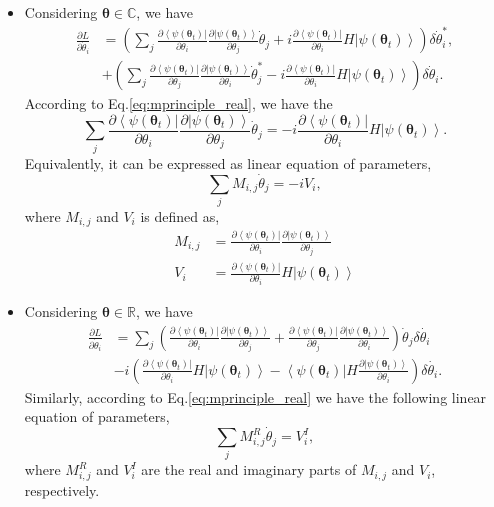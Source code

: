 \documentclass[twocolumn,
pra,aps,superscriptaddress,showpacs,amsmath,amssymb]{revtex4-2}
\begin{document}
\begin{itemize}
\item Considering $\bm{\theta} \in \mathbb{C}$, we have
\begin{align}
\frac{\partial{L}}{\partial\dot{\theta}_i}& =\left(\sum_j\frac{\partial\left<\psi(\bm{\theta}_t)\right|}{\partial\theta_i}\frac{\partial\left|\psi(\bm{\theta}_t)\right>}{\partial\theta_j}\dot{\theta}_j+i\frac{\partial\left<\psi(\bm{\theta}_t)\right|}{\partial\theta_i}H\left|\psi(\bm{\theta}_t)\right>\right)\delta\dot{\theta}_i^*,  \\
&+\left(\sum_j\frac{\partial\left<\psi(\bm{\theta}_t)\right|}{\partial\theta_j}\frac{\partial\left|\psi(\bm{\theta}_t)\right>}{\partial\theta_i}\dot{\theta}_j^*-i\frac{\partial\left<\psi(\bm{\theta}_t)\right|}{\partial\theta_i}H\left|\psi(\bm{\theta}_t)\right>\right)\delta\dot{\theta}_i.
\end{align}
According to Eq.\eqref{eq:mprinciple_real}, we have the 
\begin{equation}
\sum_j\frac{\partial\left<\psi(\bm{\theta}_t)\right|}{\partial\theta_i}\frac{\partial\left|\psi(\bm{\theta}_t)\right>}{\partial\theta_j}\dot{\theta}_j=-i\frac{\partial\left<\psi(\bm{\theta}_t)\right|}{\partial\theta_i}H\left|\psi(\bm{\theta}_t)\right>.
\end{equation}
Equivalently, it can be expressed as linear equation of parameters,
\begin{equation}
\sum_jM_{i,j}\dot{\theta}_j=-iV_i,
\end{equation}
where $M_{i,j}$ and $V_i$ is defined as,
\begin{align}
\label{eq:Mr}
M_{i,j}& = \frac{\partial\left<\psi(\bm{\theta}_t)\right|}{\partial\theta_i}\frac{\partial\left|\psi(\bm{\theta}_t)\right>}{\partial\theta_j}\\
V_i &= \frac{\partial\left\langle\psi(\boldsymbol{\theta}_t)\right|}{\partial\theta_{i}}H\left|\psi(\boldsymbol{\theta}_t)\right\rangle 
\end{align}
\item Considering $\bm{\theta}\in \mathbb{R}$, we have
\begin{align}
\label{eq:Vi}
\frac{\partial{L}}{\partial\dot{\theta}_i}& = \sum_j\left(\frac{\partial\left<\psi(\bm{\theta}_t)\right|}{\partial\theta_i}\frac{\partial\left|\psi(\bm{\theta}_t)\right>}{\partial\theta_j}+\frac{\partial\left<\psi(\bm{\theta}_t)\right|}{\partial\theta_j}\frac{\partial\left|\psi(\bm{\theta}_t)\right>}{\partial\theta_i}\right)\dot{\theta}_j\delta\dot{\theta_i}\\
&-i\left(\frac{\partial\left<\psi(\bm{\theta}_t)\right|}{\partial\theta_i}H\left|\psi(\bm{\theta}_t)\right>-\left<\psi(\bm{\theta}_t)\right|H\frac{\partial\left|\psi(\bm{\theta}_t)\right>}{\partial\theta_i}\right)\delta\dot{\theta_i}.
\end{align}
Similarly, according to Eq.\eqref{eq:mprinciple_real} we have the following linear equation of parameters,
\begin{equation}
\sum_jM_{i,j}^R\dot{\theta}_j=V_i^I,
\end{equation}
where $M_{i,j}^R$ and $V_i^I$ are the real and imaginary parts of $M_{i,j}$ and $V_i$, respectively.
\end{itemize}
\end{document}
